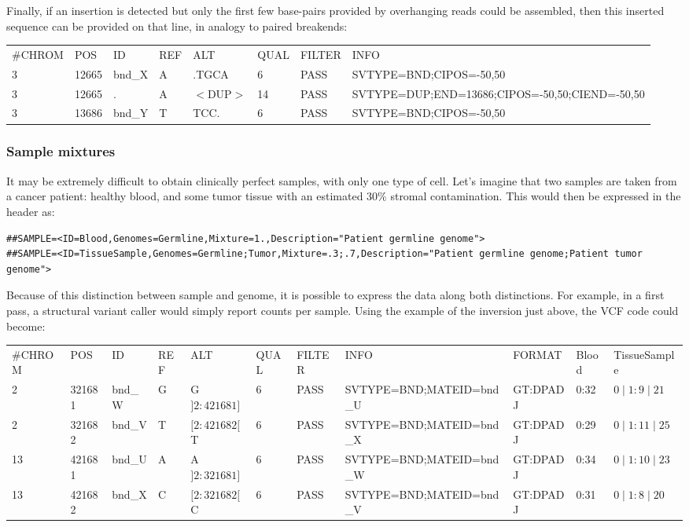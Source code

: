 \documentclass[8pt]{article}
\begin{document}
Finally, if an insertion is detected but only the first few base-pairs provided by overhanging reads could be assembled, then this inserted sequence can be provided on that line, in analogy to paired breakends:

\vspace{0.3cm}
\scriptsize
\begin{tabular}{ l l l l l l l l }
\#CHROM & POS & ID & REF & ALT & QUAL & FILTER & INFO \\
3 & 12665 & bnd\_X & A & .TGCA & 6 & PASS & SVTYPE=BND;CIPOS=-50,50 \\
3 & 12665 & . & A & $<$DUP$>$ & 14 & PASS & SVTYPE=DUP;END=13686;CIPOS=-50,50;CIEND=-50,50 \\
3 & 13686 & bnd\_Y & T & TCC. & 6 & PASS & SVTYPE=BND;CIPOS=-50,50 \\
\end{tabular}
\normalsize

\subsubsection{Sample mixtures}
It may be extremely difficult to obtain clinically perfect samples, with only one type of cell. Let's imagine that two samples are taken from a cancer patient: healthy blood, and some tumor tissue with an estimated 30\% stromal contamination. This would then be expressed in the header as:

\footnotesize
\begin{verbatim}
##SAMPLE=<ID=Blood,Genomes=Germline,Mixture=1.,Description="Patient germline genome">
##SAMPLE=<ID=TissueSample,Genomes=Germline;Tumor,Mixture=.3;.7,Description="Patient germline genome;Patient tumor genome">
\end{verbatim}
\normalsize

Because of this distinction between sample and genome, it is possible to express the data along both distinctions. For example, in a first pass, a structural variant caller would simply report counts per sample. Using the example of the inversion just above, the VCF code could become:

\vspace{0.3cm}
\tiny
\begin{flushleft}
\begin{tabular}{ l l l l l l l l l l l }
\#CHROM & POS & ID & REF & ALT & QUAL & FILTER & INFO & FORMAT & Blood & TissueSample\\
2 & 321681 & bnd\_W & G & G$]2:421681]$ & 6 & PASS & SVTYPE=BND;MATEID=bnd\_U & GT:DPADJ & 0:32 & $0\mid1:9\mid21$ \\
2 & 321682 & bnd\_V & T & $[2:421682[$T & 6 & PASS & SVTYPE=BND;MATEID=bnd\_X & GT:DPADJ & 0:29 & $0\mid1:11\mid25$ \\
13 & 421681 & bnd\_U & A & A$]2:321681]$ & 6 & PASS & SVTYPE=BND;MATEID=bnd\_W & GT:DPADJ & 0:34 & $0\mid1:10\mid23$ \\
13 & 421682 & bnd\_X & C & $[2:321682[$C & 6 & PASS & SVTYPE=BND;MATEID=bnd\_V & GT:DPADJ & 0:31 & $0\mid1:8\mid20$ \\
\end{tabular}
\end{flushleft}
\normalsize
\vspace{0.3cm}
\end{document}
